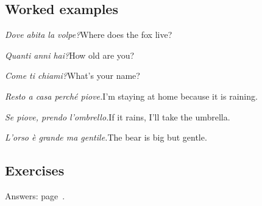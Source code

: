 \documentclass[11pt,a4paper,twoside,openright]{book}
\begin{document}
\subsection*{Worked examples}
\begin{examples}
\item\relax \textit{Dove abita la volpe?}\newline Where does the fox live?
\item\relax \textit{Quanti anni hai?}\newline How old are you?
\item\relax \textit{Come ti chiami?}\newline What's your name?
\item\relax \textit{Resto a casa perché piove.}\newline I'm staying at home because it is raining.
\item\relax \textit{Se piove, prendo l'ombrello.}\newline If it rains, I'll take the umbrella.
\item\relax \textit{L'orso è grande ma gentile.}\newline The bear is big but gentle.
\end{examples}

\subsection*{Exercises}\label{les:question-words-conjunctions:exercises}
{\color{muted}\small Answers: page~\pageref{ans:question-words-conjunctions}.}
\end{document}
